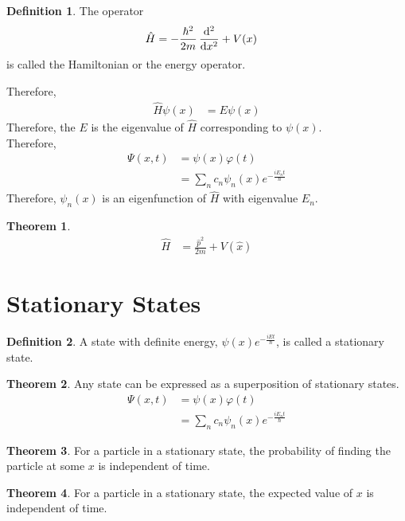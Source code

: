 \documentclass[titlepage, fleqn, a4paper, 12pt, twoside]{article}
\theoremstyle{definition}
\newtheorem{definition}{Definition}
\theoremstyle{theorem}
\newtheorem{theorem}{Theorem}
\let\Oldsection\section
\renewcommand{\section}{\FloatBarrier\Oldsection}
\begin{document}
\begin{definition}
	The operator
	\begin{align*}
		\hat{H} &= -\frac{\hbar^2}{2 m} \dod[2]{}{x} + V(x)
	\end{align*}
	is called the Hamiltonian or the energy operator.
\end{definition}
Therefore,
\begin{align*}
	\hat{H} \psi(x) &= E \psi(x)
\end{align*}
Therefore, the $E$ is the eigenvalue of $\hat{H}$ corresponding to $\psi(x)$.\\
Therefore,
\begin{align*}
	\Psi(x,t) &= \psi(x) \varphi(t)\\
	&= \sum\limits_{n} c_n \psi_n(x) e^{-\frac{i E_n t}{\hbar}}
\end{align*}
Therefore, $\psi_n(x)$ is an eigenfunction of $\hat{H}$ with eigenvalue $E_n$.

\begin{theorem}
	\begin{align*}
		\hat{H} &= \frac{\hat{p}^2}{2 m} + V\left( \hat{x} \right)
	\end{align*}
\end{theorem}

\section{Stationary States}

\begin{definition}
	A state with definite energy, $\psi(x) e^{-\frac{i E t}{\hbar}}$, is called a stationary state.
\end{definition}

\begin{theorem}
	Any state can be expressed as a superposition of stationary states.
	\begin{align*}
		\Psi(x,t) &= \psi(x) \varphi(t)\\
		&= \sum\limits_{n} c_n \psi_n(x) e^{-\frac{i E_n t}{\hbar}}
	\end{align*}
\end{theorem}

\begin{theorem}
	For a particle in a stationary state, the probability of finding the particle at some $x$ is independent of time.
\end{theorem}

\begin{theorem}
	For a particle in a stationary state, the expected value of $x$ is independent of time.
\end{theorem}
\end{document}

